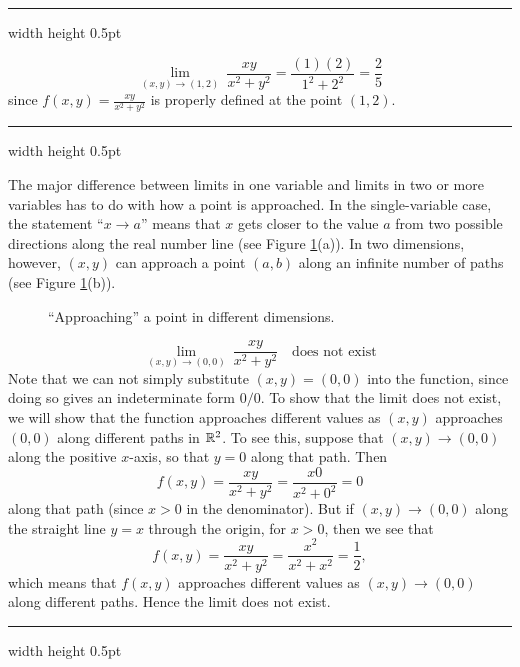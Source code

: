 \medskip
\hrule width \textwidth height 0.5pt
\begin{exmp}
 \begin{displaymath}
 \lim_{(x,y) \to (1,2)}~ \frac{xy}{x^2 + y^2} = \frac{(1)(2)}{1^2 + 2^2} = \frac{2}{5}
 \end{displaymath}
 since $f(x,y) = \frac{xy}{x^2 + y^2}$ is properly defined at the point $(1,2)$.
\end{exmp}
\hrule width \textwidth height 0.5pt
\medskip

The major difference between limits in one variable and limits in two or more variables has to do with how a point is
approached. 
In the single-variable case, the statement ``$x \rightarrow a$'' means that $x$ gets closer to the value $a$
from two possible directions along the real number line (see
Figure \ref{fig:mlim}(a)). 
In two dimensions, however, $(x,y)$ can approach a point $(a,b)$ along an infinite
number of paths (see Figure \ref{fig:mlim}(b)).

\begin{figure}[h]
 \centering
 \qquad
 \caption[]{\quad ``Approaching'' a point in different dimensions.}
 \label{fig:mlim}
\end{figure}

\begin{exmp}
 \begin{displaymath}
 \lim_{(x,y) \to (0,0)}~ \frac{xy}{x^2 + y^2} \text{~~~does not exist}
 \end{displaymath}
 Note that we can not simply substitute $(x,y) = (0,0)$ into the function, since doing so gives an indeterminate
 form $0/0$. 
 To show that the limit does not exist, we will show that the function approaches different values as
 $(x,y)$ approaches $(0,0)$ along different paths in $\mathbb{R}^{2}$.
 To see this, suppose that $(x,y) \rightarrow (0,0)$ along the positive $x$-axis, so that $y = 0$ along that path. 
 Then
 \begin{displaymath}
  f(x,y) = \frac{xy}{x^2 + y^2} = \frac{x 0}{x^2 + 0^2} = 0
 \end{displaymath}
 along that path (since $x > 0$ in the denominator). 
 But if
 $(x,y) \rightarrow (0,0)$ along the straight line $y = x$ through the origin, for $x > 0$, then we see that
 \begin{displaymath}
  f(x,y) = \frac{xy}{x^2 + y^2} = \frac{x^2}{x^2 + x^2} = \frac{1}{2},
 \end{displaymath}
 which means that $f(x,y)$ approaches different values as $(x,y) \rightarrow (0,0)$ along different paths. 
 Hence the
 limit does not exist.
\end{exmp}
\hrule width \textwidth height 0.5pt
\medskip

